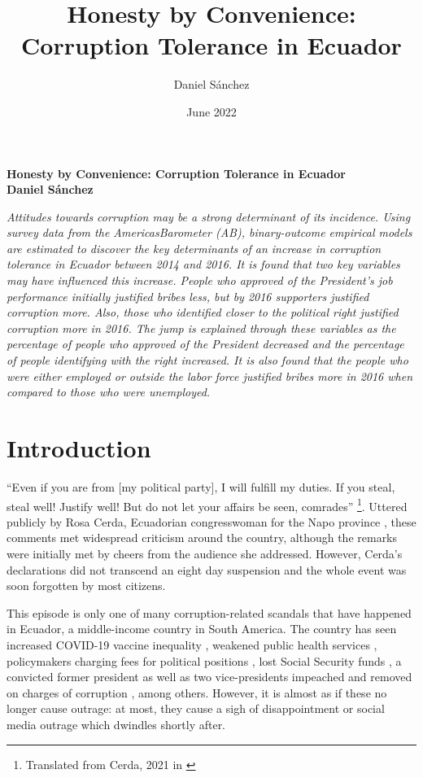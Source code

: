 \documentclass[12pt,a4]{article}\usepackage[]{graphicx}\usepackage[]{xcolor}
\title{Honesty by Convenience: Corruption Tolerance in Ecuador}
\author{Daniel Sánchez}
\date{June 2022}
\begin{document}





\begin{center}
\textbf{
Honesty by Convenience: Corruption Tolerance in Ecuador\\
Daniel Sánchez}
\end{center}

\textit{
Attitudes towards corruption may be a strong determinant of its incidence. Using survey
data from the AmericasBarometer (AB), binary-outcome empirical models are estimated to discover
the key determinants of an increase in corruption tolerance in Ecuador between 2014 and
2016. It is found that two key variables may have influenced this increase. People who approved
of the President’s job performance initially justified bribes less, but by 2016 supporters justified corruption more. Also, those who identified closer to the political right justified corruption more in 2016. The jump is explained through these variables as the percentage of people who approved of the President decreased and the percentage of people identifying with the right increased. It is also found that the people who were either employed or outside the labor force justified bribes more in 2016 when compared to those who were unemployed.}




\section{Introduction}
\enquote{Even if you are from [my political party], I will fulfill my duties. If you steal, steal well!  Justify well! But do not let your affairs be seen, comrades} \footnote{Translated from Cerda, 2021 in \cite[para. 2]{PlanV.2021}}. Uttered publicly by Rosa Cerda, Ecuadorian congresswoman for the Napo province \parencite{Castro.2021}, these comments met widespread criticism around the country, although the remarks were initially met by cheers from the audience she addressed. However, Cerda's declarations did not transcend an eight day suspension \parencite{Ordonez.2021} and the whole event was soon forgotten by most citizens. 

This episode is only one of many corruption-related scandals that have happened in Ecuador, a middle-income country in South America. The country has seen increased COVID-19 vaccine inequality \parencite{Taj.2021}, weakened public health services \parencite{Celi.2020}, policymakers charging fees for political positions \parencite{Espinosa.2021}, lost Social Security funds \parencite{Pesantes.9152020}, a convicted former president as well as two vice-presidents impeached and removed on charges of corruption \parencite{Cabrera.2020}, among others. However, it is almost as if these no longer cause outrage: at most, they cause a sigh of disappointment or social media outrage which dwindles shortly after.
\end{document}
